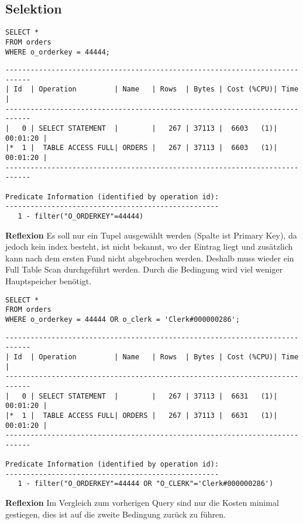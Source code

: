 \documentclass[10pt]{article}
\begin{document}
\subsection{Selektion}
\begin{lstlisting}[style=sql]
SELECT *
FROM orders
WHERE o_orderkey = 44444;
\end{lstlisting}
\begin{lstlisting}[style=queryexecutionplan]
----------------------------------------------------------------------------
| Id  | Operation         | Name   | Rows  | Bytes | Cost (%CPU)| Time     |
----------------------------------------------------------------------------
|   0 | SELECT STATEMENT  |        |   267 | 37113 |  6603   (1)| 00:01:20 |
|*  1 |  TABLE ACCESS FULL| ORDERS |   267 | 37113 |  6603   (1)| 00:01:20 |
----------------------------------------------------------------------------

Predicate Information (identified by operation id):
---------------------------------------------------
   1 - filter("O_ORDERKEY"=44444)
\end{lstlisting}
\textbf{Reflexion} \newline
Es soll nur ein Tupel ausgewählt werden (Spalte ist Primary Key), da jedoch 
kein index besteht, ist nicht bekannt, wo der Eintrag liegt und zusätzlich 
kann nach dem ersten Fund nicht abgebrochen werden. Deshalb muss wieder ein 
Full Table Scan durchgeführt werden. Durch die Bedingung wird viel weniger 
Hauptspeicher benötigt.

\begin{lstlisting}[style=sql]
SELECT *
FROM orders
WHERE o_orderkey = 44444 OR o_clerk = 'Clerk#000000286';
\end{lstlisting}
\begin{lstlisting}[style=queryexecutionplan]
----------------------------------------------------------------------------
| Id  | Operation         | Name   | Rows  | Bytes | Cost (%CPU)| Time     |
----------------------------------------------------------------------------
|   0 | SELECT STATEMENT  |        |   267 | 37113 |  6631   (1)| 00:01:20 |
|*  1 |  TABLE ACCESS FULL| ORDERS |   267 | 37113 |  6631   (1)| 00:01:20 |
----------------------------------------------------------------------------

Predicate Information (identified by operation id):
---------------------------------------------------
   1 - filter("O_ORDERKEY"=44444 OR "O_CLERK"='Clerk#000000286')
\end{lstlisting}
\textbf{Reflexion} \newline
Im Vergleich zum vorherigen Query sind nur die Kosten minimal gestiegen, dies 
ist auf die zweite Bedingung zurück zu führen.
\end{document}

